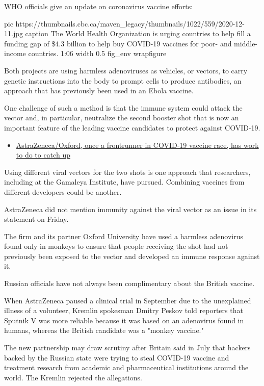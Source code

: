 WHO officials give an update on coronavirus vaccine efforts:

\ifcmt
  pic https://thumbnails.cbc.ca/maven_legacy/thumbnails/1022/559/2020-12-11.jpg
  caption The World Health Organization is urging countries to help fill a funding gap of \$4.3 billion to help buy COVID-19 vaccines for poor- and middle-income countries. 1:06
  width 0.5
  fig_env wrapfigure
\fi

Both projects are using harmless adenoviruses as vehicles, or vectors, to carry
genetic instructions into the body to prompt cells to produce antibodies, an
approach that has previously been used in an Ebola vaccine.

One challenge of such a method is that the immune system could attack the
vector and, in particular, neutralize the second booster shot that is now an
important feature of the leading vaccine candidates to protect against
COVID-19.

\begin{itemize}
\item \href{https://www.cbc.ca/news/health/covid-19-vaccine-oxford-astra-zeneca-lancet-1.5832798}{AstraZeneca/Oxford, once a frontrunner in COVID-19 vaccine race, has work to do to catch up}
\end{itemize}

Using different viral vectors for the two shots is one approach that
researchers, including at the Gamaleya Institute, have pursued. Combining
vaccines from different developers could be another.

AstraZeneca did not mention immunity against the viral vector as an issue in
its statement on Friday.

The firm and its partner Oxford University have used a harmless adenovirus
found only in monkeys to ensure that people receiving the shot had not
previously been exposed to the vector and developed an immune response against
it.

Russian officials have not always been complimentary about the British vaccine.

When AstraZeneca paused a clinical trial in September due to the unexplained
illness of a volunteer, Kremlin spokesman Dmitry Peskov told reporters that
Sputnik V was more reliable because it was based on an adenovirus found in
humans, whereas the British candidate was a "monkey vaccine."

The new partnership may draw scrutiny after Britain said in July that hackers
backed by the Russian state were trying to steal COVID-19 vaccine and treatment
research from academic and pharmaceutical institutions around the world. The
Kremlin rejected the allegations.

